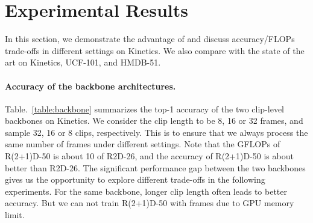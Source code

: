\documentclass[10pt,twocolumn,letterpaper]{article}
\begin{document}
{{\begin{table}[t]
\centering
{}
\caption{{\bf Comparison of different  architectures for aggregation on Kinetics.} The clip length  is 8. For all the methods, only  the first clip is processed by the expensive model, and the remaining clips are processed by the lightweight model.} 
\label{tab:rnn_variations}
\end{table}


 \section{Experimental Results}
In this section, we demonstrate the advantage of \oursfr and discuss accuracy/FLOPs trade-offs in different settings  on Kinetics. We also compare \oursfr with the state of the art on Kinetics, UCF-101, and HMDB-51.


\paragraph{Accuracy of the backbone architectures.} 
Table.~\ref{table:backbone} summarizes the top-1 accuracy of the two clip-level backbones on Kinetics. We consider the clip length  to be 8, 16 or 32 frames, and sample 32, 16 or 8 clips, respectively. This is to ensure that we always process the same number of frames under different settings. Note that the GFLOPs of R(2+1)D-50 is about 10 of R2D-26, and the accuracy of R(2+1)D-50 is about  better than R2D-26. The significant performance gap between the two backbones gives us the opportunity to explore different trade-offs in the following experiments. For the same backbone, longer clip length  often leads to better accuracy. But we can not train R(2+1)D-50 with  frames due to GPU memory limit.

}}
\end{document}
